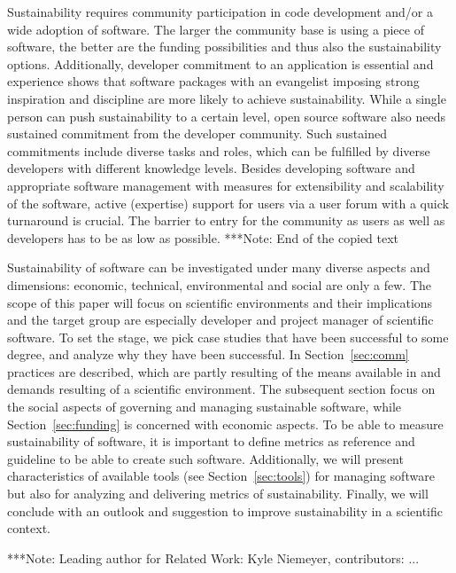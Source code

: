 \documentclass[11pt, oneside]{amsart}
\newcommand{\note}[1]{ {\textcolor{blueish}    { ***Note:      #1 }}}
\begin{document}
Sustainability requires community participation in code development and/or a
wide adoption of software. The larger the community base is using a piece of
software, the better are the funding possibilities and thus also the
sustainability options. Additionally, developer commitment to an application is
essential and experience shows that software packages with an evangelist
imposing strong inspiration and discipline are more likely to achieve
sustainability. While a single person can push sustainability to a certain
level, open source software also needs sustained commitment from the developer
community. Such sustained commitments include diverse tasks and roles, which can
be fulfilled by diverse developers with different knowledge levels. Besides
developing software and appropriate software management with measures for
extensibility and scalability of the software, active (expertise) support for
users via a user forum with a quick turnaround is crucial. The barrier to entry
for the community as users as well as developers has to be as low as possible.
\note{End of the copied text}

Sustainability of software can be investigated under many diverse aspects and dimensions: 
economic, technical, environmental and social are only a few. The scope of this paper will focus 
on scientific environments and their implications and the target group are especially developer 
and project manager of scientific software. To set the stage, we pick case studies that have been 
successful to some degree, and analyze why they have been successful. In Section~\ref{sec:comm}  
practices are described, which are partly resulting of the means available in and demands resulting of a scientific environment. 
The subsequent section focus on the social aspects of governing and managing sustainable software, 
while Section~\ref{sec:funding} is concerned with economic aspects. To be able to measure sustainability of 
software, it is important to define metrics as reference and guideline to be able to create such 
software. Additionally, we will present characteristics of available tools (see Section~\ref{sec:tools}) 
for managing software but also for analyzing and delivering metrics of sustainability. Finally, 
we will conclude with an outlook and suggestion to improve sustainability in a scientific context.  

\note{Leading author for Related Work: Kyle Niemeyer, contributors: ...}



\end{document}
